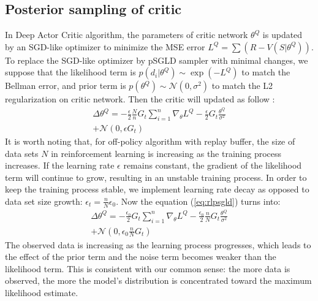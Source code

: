 \subsection{Posterior sampling of critic}
\label{sec:samplecritic}
In Deep Actor Critic algorithm, the parameters of critic network $\theta^Q$ is updated by an SGD-like optimizer to minimize the MSE error $L^Q=\sum(R-V(S|\theta^Q))$. To replace the SGD-like optimizer by pSGLD sampler with minimal changes, we suppose that the likelihood term is $p(d_i|\theta^Q)\sim\exp(-L^Q)$ to match the Bellman error, and prior term is $p(\theta^Q)\sim \mathcal{N}(0,\sigma^2)$ to match the L2 regularization on critic network. Then the critic will updated as follow :
\begin{equation}
   \label{eq:rlpsgld} 
   \begin{aligned}
      \Delta\theta^Q =-\frac{\epsilon}{2}\frac{N}{n}G_t\sum_{i=1}^{n}\nabla_\theta L^Q -\frac{\epsilon}{2}G_t \frac{\theta^Q}{\sigma^2}\\
      +\mathcal{N}(0,\epsilon G_t)
   \end{aligned}
\end{equation}
It is worth noting that, for off-policy algorithm with replay buffer, the size of data sets $N$ in reinforcement learning is increasing as the training process increases. If the learning rate $\epsilon$ remains constant, the gradient of the likelihood term will continue to grow, resulting in an unstable training process. In order to keep the training process stable, we implement learning rate decay as opposed to data set size growth: $\epsilon_t=\frac{n}{N}\epsilon_0$. Now the equation (\ref{eq:rlpsgld}) turns into:
\begin{equation}
   \label{eq:rlpsgld1} 
   \begin{aligned}
      \Delta\theta^Q =-\frac{\epsilon_0}{2}G_t\sum_{i=1}^{n}\nabla_\theta L^Q -\frac{\epsilon_0}{2}\frac{n}{N}G_t \frac{\theta^Q}{\sigma^2}\\
      +\mathcal{N}(0,\epsilon_0\frac{n}{N} G_t)
   \end{aligned}
\end{equation}
The observed data is increasing as the learning process progresses, which leads to the effect of the prior term and the noise term becomes weaker than the likelihood term. This is consistent with our common sense: the more data is observed, the more the model's distribution is concentrated toward the maximum likelihood estimate.
